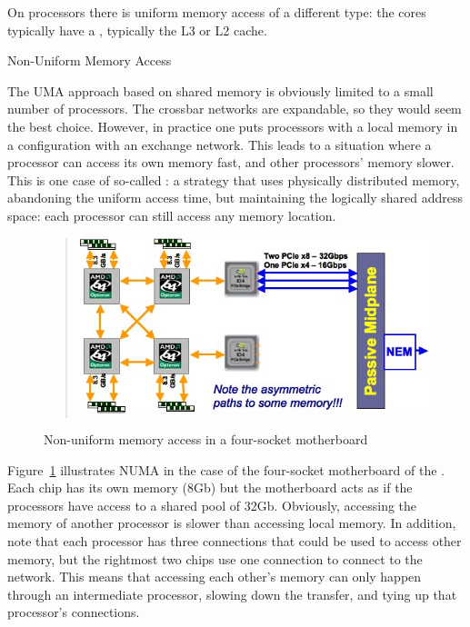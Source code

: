 On  processors there is uniform memory access of
a different type: the cores typically have a
, typically the L3 or L2 cache.

 {Non-Uniform Memory Access}
\label{sec:numa}

The \ac{UMA} approach based on shared memory 
is obviously limited to a small number of
processors. The crossbar networks are expandable, so they would seem 
the best choice. 
However, in practice one puts 
processors with a local memory in a configuration with an exchange
network. This leads to a situation where a processor can access its
own memory fast, and other processors' memory slower.
This is one case of so-called : a strategy that
uses physically distributed memory, abandoning the uniform access
time, but maintaining the logically shared address space: each processor can
still access any memory location.

\begin{figure}
  \begin{quote}
  \includegraphics[scale=.6]{graphics/ranger-numa}
  \end{quote}
  \caption{Non-uniform memory access in a four-socket motherboard}
  \label{fig:ranger-numa}
\end{figure}

Figure~\ref{fig:ranger-numa} illustrates \ac{NUMA} in the case of the
four-socket motherboard of the . Each chip has its
own memory (8Gb) but the motherboard acts as if the processors have
access to a shared pool of 32Gb. Obviously, accessing the memory of
another processor is slower than accessing local memory. In addition,
note that each processor has three connections that could be used to
access other memory, but the rightmost two chips use one connection to
connect to the network. This means that accessing each other's memory
can only happen through an intermediate processor, slowing down the
transfer, and tying up that processor's connections.

